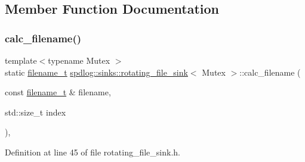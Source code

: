 \subsection{Member Function Documentation}
\mbox{\label{classspdlog_1_1sinks_1_1rotating__file__sink_a05d77d7013bc54f55cac702c122ac1c9}} 
\subsubsection{\texorpdfstring{calc\+\_\+filename()}{calc\_filename()}}
{\footnotesize\ttfamily template$<$typename Mutex $>$ \\
static \hyperlink{namespacespdlog_acf7ce125b3622e44f8f1702d699e0b06}{filename\+\_\+t} \hyperlink{classspdlog_1_1sinks_1_1rotating__file__sink}{spdlog\+::sinks\+::rotating\+\_\+file\+\_\+sink}$<$ Mutex $>$\+::calc\+\_\+filename (\begin{DoxyParamCaption}\item[{const \hyperlink{namespacespdlog_acf7ce125b3622e44f8f1702d699e0b06}{filename\+\_\+t} \&}]{filename,  }\item[{std\+::size\+\_\+t}]{index }\end{DoxyParamCaption})\hspace{0.3cm}{\ttfamily [inline]}, {\ttfamily [static]}}



Definition at line 45 of file rotating\+\_\+file\+\_\+sink.\+h.

